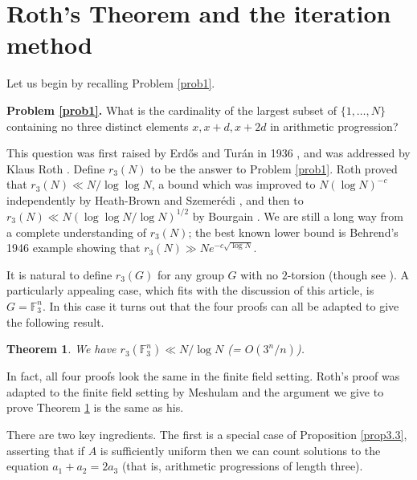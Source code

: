 \documentclass[12pt,a4paper,reqno]{amsart}
\numberwithin{equation}{section}
\theoremstyle{plain}
\newtheorem{theorem}[subsection]{Theorem}
\theoremstyle{definition}
\begin{document}
\section{Roth's Theorem and the iteration method}\label{sec4}

\noindent Let us begin by recalling Problem \ref{prob1}.\vspace{11pt}

\noindent\textbf{Problem \ref{prob1}.} What is the cardinality of the largest subset of $\{1,\dots,N\}$ containing no three distinct elements $x,x+d,x+2d$ in arithmetic progression?\vspace{11pt}

\noindent This question was first raised by Erd\H{o}s and Tur\'an in 1936 \cite{erdos-turan}, and was addressed by
Klaus Roth \cite{roth}. Define $r_3(N)$ to be the answer to Problem \ref{prob1}. Roth proved that $r_3(N) \ll N/\log \log N$, a bound which was improved to $N(\log N)^{-c}$ independently by Heath-Brown \cite{heath-brown} and Szemer\'edi \cite{szemeredi-aps}, and then to $r_3(N) \ll N(\log\log N/\log N)^{1/2}$ by Bourgain \cite{bourgain2}. We are still a long way from a complete understanding of $r_3(N)$; the best known lower bound is Behrend's \cite{behrend} 1946 example showing that $r_3(N) \gg Ne^{-c\sqrt{\log N}}$.\vspace{11pt}

\noindent It is natural to define $r_3(G)$ for any group $G$ with no $2$-torsion (though see \cite{lev}). A particularly appealing case, which fits with the discussion of this article, is $G = \mathbb{F}_3^n$. In this case it turns out that the four proofs \cite{bourgain2,heath-brown,roth,szemeredi-aps} can all be adapted to give the following result.

\begin{theorem}\label{finite-field-roth}
We have $r_3(\mathbb{F}_3^n) \ll N/\log N$ \textup{(}= $O(3^n/n)$\textup{)}.
\end{theorem}
\noindent In fact, all four proofs look the same in the finite field setting. Roth's proof was adapted to the finite field setting by Meshulam \cite{meshulam} and the argument we give to prove Theorem \ref{finite-field-roth} is the same as his.\vspace{11pt}

\noindent There are two key ingredients. The first is a special case of Proposition \ref{prop3.3}, asserting that if $A$ is sufficiently uniform then we can count solutions to the equation $a_1 + a_2 = 2a_3$ (that is, arithmetic progressions of length three).
\end{document}
